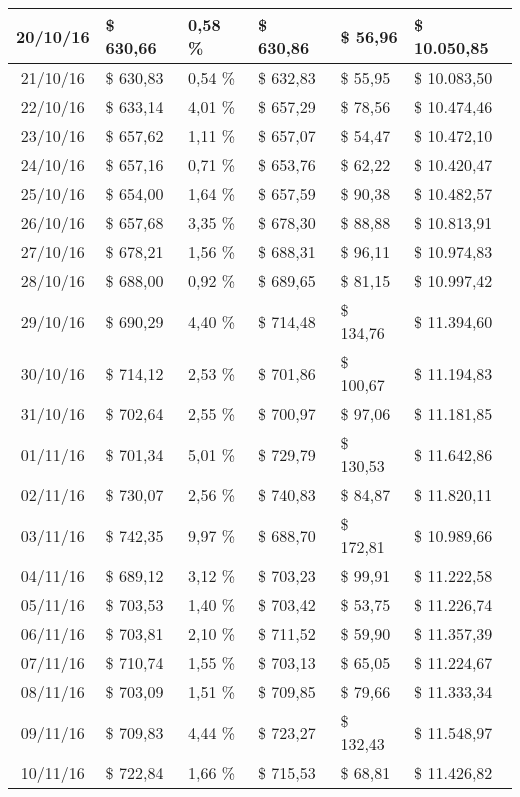 \begin{small}
\begin{longtable}{|c|l|l|l|l|l|}
20/10/16 & \$ 630,66 & 0,58 \% & \$ 630,86 & \$ 56,96 & \$ 10.050,85 \\ \hline
21/10/16 & \$ 630,83 & 0,54 \% & \$ 632,83 & \$ 55,95 & \$ 10.083,50 \\ \hline
22/10/16 & \$ 633,14 & 4,01 \% & \$ 657,29 & \$ 78,56 & \$ 10.474,46 \\ \hline
23/10/16 & \$ 657,62 & 1,11 \% & \$ 657,07 & \$ 54,47 & \$ 10.472,10 \\ \hline
24/10/16 & \$ 657,16 & 0,71 \% & \$ 653,76 & \$ 62,22 & \$ 10.420,47 \\ \hline
25/10/16 & \$ 654,00 & 1,64 \% & \$ 657,59 & \$ 90,38 & \$ 10.482,57 \\ \hline
26/10/16 & \$ 657,68 & 3,35 \% & \$ 678,30 & \$ 88,88 & \$ 10.813,91 \\ \hline
27/10/16 & \$ 678,21 & 1,56 \% & \$ 688,31 & \$ 96,11 & \$ 10.974,83 \\ \hline
28/10/16 & \$ 688,00 & 0,92 \% & \$ 689,65 & \$ 81,15 & \$ 10.997,42 \\ \hline
29/10/16 & \$ 690,29 & 4,40 \% & \$ 714,48 & \$ 134,76 & \$ 11.394,60 \\ \hline
30/10/16 & \$ 714,12 & 2,53 \% & \$ 701,86 & \$ 100,67 & \$ 11.194,83 \\ \hline
31/10/16 & \$ 702,64 & 2,55 \% & \$ 700,97 & \$ 97,06 & \$ 11.181,85 \\ \hline
01/11/16 & \$ 701,34 & 5,01 \% & \$ 729,79 & \$ 130,53 & \$ 11.642,86 \\ \hline
02/11/16 & \$ 730,07 & 2,56 \% & \$ 740,83 & \$ 84,87 & \$ 11.820,11 \\ \hline
03/11/16 & \$ 742,35 & 9,97 \% & \$ 688,70 & \$ 172,81 & \$ 10.989,66 \\ \hline
04/11/16 & \$ 689,12 & 3,12 \% & \$ 703,23 & \$ 99,91 & \$ 11.222,58 \\ \hline
05/11/16 & \$ 703,53 & 1,40 \% & \$ 703,42 & \$ 53,75 & \$ 11.226,74 \\ \hline
06/11/16 & \$ 703,81 & 2,10 \% & \$ 711,52 & \$ 59,90 & \$ 11.357,39 \\ \hline
07/11/16 & \$ 710,74 & 1,55 \% & \$ 703,13 & \$ 65,05 & \$ 11.224,67 \\ \hline
08/11/16 & \$ 703,09 & 1,51 \% & \$ 709,85 & \$ 79,66 & \$ 11.333,34 \\ \hline
09/11/16 & \$ 709,83 & 4,44 \% & \$ 723,27 & \$ 132,43 & \$ 11.548,97 \\ \hline
10/11/16 & \$ 722,84 & 1,66 \% & \$ 715,53 & \$ 68,81 & \$ 11.426,82 \\ \hline

\end{longtable}
\end{small}
